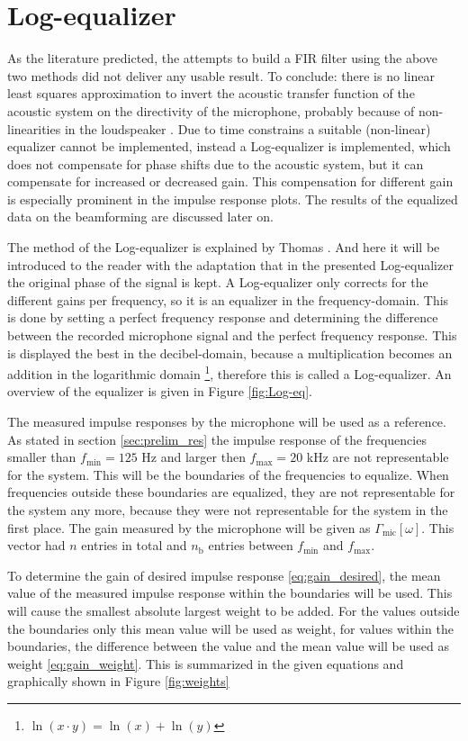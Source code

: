 \section{Log-equalizer}
As the literature predicted, the attempts to build a FIR filter using the above two methods did not deliver any usable result.
To conclude: there is no linear least squares approximation to invert the acoustic transfer function of the acoustic system on the directivity of the microphone, probably because of non-linearities in the loudspeaker \cite{Thomas2006}.
Due to time constrains a suitable (non-linear) equalizer cannot be implemented, instead a Log-equalizer is implemented, which does not compensate for phase shifts due to the acoustic system, but it can compensate for increased or decreased gain.
This compensation for different gain is especially prominent in the impulse response plots.
The results of the equalized data on the beamforming are discussed later on.

The method of the Log-equalizer is explained by Thomas \cite{Thomas2006}.
And here it will be introduced to the reader with the adaptation that in the presented Log-equalizer the original phase of the signal is kept.
A Log-equalizer only corrects for the different gains per frequency, so it is an equalizer in the frequency-domain.
This is done by setting a perfect frequency response and determining the difference between the recorded microphone signal and the perfect frequency response.
This is displayed the best in the decibel-domain, because a multiplication becomes an addition in the logarithmic domain
\footnote{$\ln(x\cdot y)=\ln(x)+\ln(y)$},
therefore this is called a Log-equalizer.
An overview of the equalizer is given in Figure \ref{fig:Log-eq}.

The measured impulse responses by the microphone will be used as a reference.
As stated in section \ref{sec:prelim_res} the impulse response of the frequencies smaller than $f_\text{min}=125$ Hz and larger then $f_\text{max}=20$ kHz are not representable for the system.
This will be the boundaries of the frequencies to equalize.
When frequencies outside these boundaries are equalized, they are not representable for the system any more, because they were not representable for the system in the first place.
The gain measured by the microphone will be given as $\Gamma_\text{mic}[\omega]$.
This vector had $n$ entries in total and $n_\text{b}$ entries between $f_\text{min}$ and $f_\text{max}$.

To determine the gain of desired impulse response \eqref{eq:gain_desired}, the mean value of the measured impulse response within the boundaries will be used.
This will cause the smallest absolute largest weight to be added.
For the values outside the boundaries only this mean value will be used as weight, for values within the boundaries, the difference between the value and the mean value will be used as weight \eqref{eq:gain_weight}.
This is summarized in the given equations and graphically shown in Figure \ref{fig:weights}

